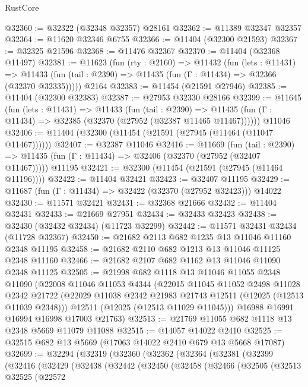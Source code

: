 \begin{lexlean}{RustCore}
\begin{coremodule}
@32360 := @32322 (@32348 @32357) @28161
@32362 := @11389 @32347 @32357
@32364 := @11620 @32346 @6755
@32366 := @11404 (@32300 @21593)
@32367 := @32325 @21596
@32368 := @11476 @32367
@32370 := @11404 (@32368 @11497)
@32381 := @11623
    (fun (rty : @2160) =>
    @11432
      (fun (lets : @11431) =>
      @11433 (fun (tail : @2390) => @11435 (fun (Γ : @11434) => @32366 (@32370 @32335)))))
    @2164
@32383 := @11454 (@21591 @27946)
@32385 := @11404 (@32300 @32383)
@32387 := @27953 @32330 @28166
@32399 := @11645
    (fun (lets : @11431) =>
    @11433
      (fun (tail : @2390) =>
      @11435 (fun (Γ : @11434) => @32385 (@32370 (@27952 (@32387 @11465 @11467))))))
    @11046
@32406 := @11404 (@32300 (@11454 (@21591 (@27945 (@11464 (@11047 @11467))))))
@32407 := @32387 @11046
@32416 := @11669
    (fun (tail : @2390) => @11435 (fun (Γ : @11434) => @32406 (@32370 (@27952 (@32407 @11467)))))
    @11195
@32421 := @32300 (@11454 (@21591 (@27945 (@11464 @11196))))
@32422 := @11404 @32421
@32423 := @32407 @11195
@32429 := @11687 (fun (Γ : @11434) => @32422 (@32370 (@27952 @32423))) @14022
@32430 := @11571 @32421
@32431 := @32368 @21666
@32432 := @11404 @32431
@32433 := @21669 @27951
@32434 := @32433 @32423
@32438 := @32430 (@32432 @32434) (@11723 @32299)
@32442 := @11571 @32431 @32434 (@11728 @32367)
@32450 := @21682 @2113 @682 @1235 @13 @11046 @11160 @2348 @11195
@32458 := @21682 @2110 @682 @1213 @13 @11046 @11125 @2348 @11160
@32466 := @21682 @2107 @682 @1162 @13 @11046 @11090 @2348 @11125
@32505 := @21998
    @682
    @1118
    @13
    @11046
    @11055
    @2348
    @11090
    (@22008
      @11046
      @11053
      @4344
      (@22015
        @11045
        @11052
        @2498
        @11028
        @2342
        @21722
        (@22029 @11038 @2342 @21983 @21743 @12511 (@12025 (@12513 @11039 @2348)))
        @12511
        (@12025 (@12513 @11029 @11045)))
      @16988
      @16991
      @16994
      @16998
      @17003
      @21763)
@32513 := @21769 @11055 @682 @1118 @13 @2348 @5669 @11079 @11088
@32515 := @14057 @14022 @2410
@32525 := @32515 @682 @13 @5669 (@17063 @14022 @2410 @679 @13 @5668 @17087)
@32699 := @32294
    (@32319
      (@32360
        (@32362
          (@32364
            (@32381
              (@32399
                (@32416
                  (@32429
                    (@32438
                      (@32442
                        (@32450
                          (@32458
                            (@32466
                              (@32505
                                (@32513
                                  @32525
                                  (@22572

\end{coremodule}
\end{lexlean}
